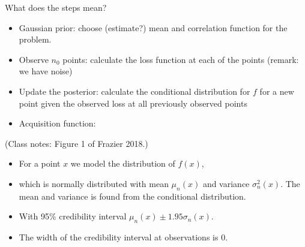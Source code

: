 \documentclass[
  ignorenonframetext,
]{beamer}
\providecommand{\tightlist}{%
  \setlength{\itemsep}{0pt}\setlength{\parskip}{0pt}}
\begin{document}
\begin{frame}
What does the steps mean?

\begin{itemize}
\tightlist
\item
  Gaussian prior: choose (estimate?) mean and correlation function for
  the problem.
\item
  Observe \(n_0\) points: calculate the loss function at each of the
  points (remark: we have noise)
\item
  Update the posterior: calculate the conditional distribution for \(f\)
  for a new point given the observed loss at all previously observed
  points
\item
  Acquisition function:
\end{itemize}

(Class notes: Figure 1 of Frazier 2018.)
\end{frame}

\begin{frame}
\begin{itemize}
\tightlist
\item
  For a point \(x\) we model the distribution of \(f(x)\),
\item
  which is normally distributed with mean \(\mu_n(x)\) and variance
  \(\sigma_n^2(x)\). The mean and variance is found from the conditional
  distribution.
\item
  With 95\% credibility interval \(\mu_n(x)\pm 1.95 \sigma_n(x)\).
\item
  The width of the credibility interval at observations is 0.
\end{itemize}
\end{frame}
\end{document}
